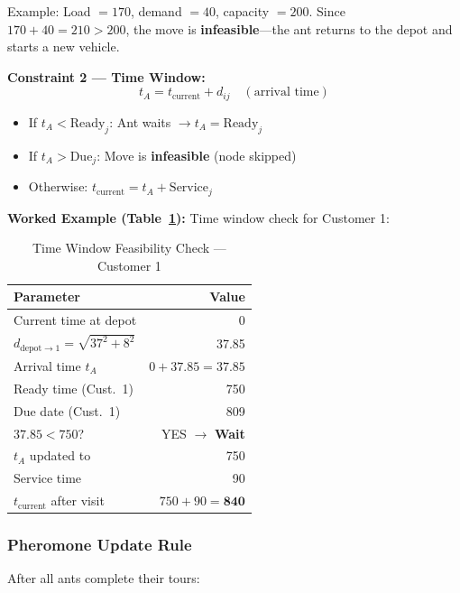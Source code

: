 \documentclass[10pt,conference]{IEEEtran}
\begin{document}
Example: Load $= 170$, demand $= 40$, capacity $= 200$. Since $170 + 40 = 210 > 200$, the move is \textbf{infeasible}---the ant returns to the depot and starts a new vehicle.

\textbf{Constraint 2 --- Time Window:}
\begin{equation}
    t_A = t_{\text{current}} + d_{ij} \quad (\text{arrival time})
\end{equation}
\begin{itemize}
    \item If $t_A < \text{Ready}_j$: Ant waits $\rightarrow t_A = \text{Ready}_j$
    \item If $t_A > \text{Due}_j$: Move is \textbf{infeasible} (node skipped)
    \item Otherwise: $t_{\text{current}} = t_A + \text{Service}_j$
\end{itemize}

\textbf{Worked Example (Table~\ref{tab:tw_check}):} Time window check for Customer 1:

\begin{table}[h]
\caption{Time Window Feasibility Check --- Customer 1}
\label{tab:tw_check}
\begin{center}
\begin{tabular}{|l|r|}
\hline
\textbf{Parameter} & \textbf{Value} \\
\hline
Current time at depot & 0 \\
$d_{\text{depot} \rightarrow 1} = \sqrt{37^2 + 8^2}$ & 37.85 \\
Arrival time $t_A$ & $0 + 37.85 = 37.85$ \\
Ready time (Cust.\ 1) & 750 \\
Due date (Cust.\ 1) & 809 \\
\hline
$37.85 < 750$? & YES $\rightarrow$ \textbf{Wait} \\
$t_A$ updated to & 750 \\
Service time & 90 \\
$t_{\text{current}}$ after visit & $750 + 90 = \mathbf{840}$ \\
\hline
\end{tabular}
\end{center}
\end{table}

\subsubsection{Pheromone Update Rule}
After all ants complete their tours:
\end{document}
